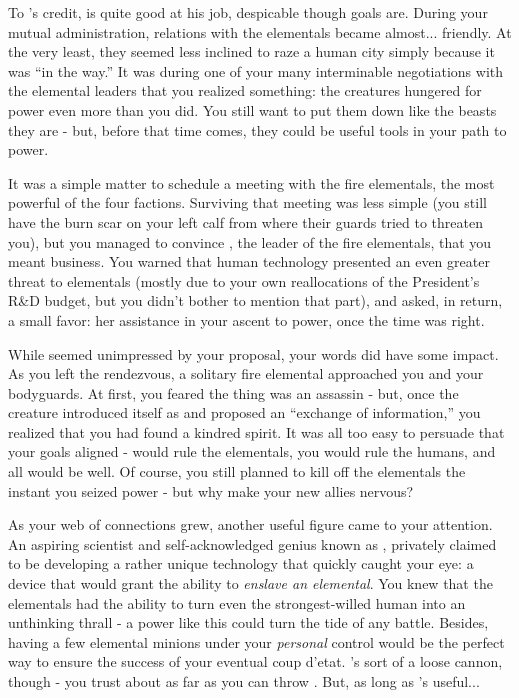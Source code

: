 \documentclass[char]{elementals}
\begin{document}
To \cLeader{}'s credit, \cLeader{\they} is quite good at his job, despicable though \cLeader{\their} goals are. During your mutual administration, relations with the elementals became almost... friendly. At the very least, they seemed less inclined to raze a human city simply because it was ``in the way.'' It was during one of your many interminable negotiations with the elemental leaders that you realized something: the creatures hungered for power even more than you did. You still want to put them down like the beasts they are - but, before that time comes, they could be useful tools in your path to power.

It was a simple matter to schedule a meeting with the fire elementals, the most powerful of the four factions. Surviving that meeting was less simple (you still have the burn scar on your left calf from where their guards tried to threaten you), but you managed to convince \cQueen{\intro}, the leader of the fire elementals, that you meant business. You warned \cQueen{\them} that human technology presented an even greater threat to elementals (mostly due to your own reallocations of the President's R\&D budget, but you didn't bother to mention that part), and asked, in return, a small favor: her assistance in your ascent to power, once the time was right.

While \cQueen{} seemed unimpressed by your proposal, your words did have some impact. As you left the rendezvous, a solitary fire elemental approached you and your bodyguards. At first, you feared the thing was an assassin - but, once the creature introduced itself as \cPyro{\intro} and proposed an ``exchange of information,'' you realized that you had found a kindred spirit. It was all too easy to persuade \cPyro{\them} that your goals aligned - \cPyro{\they} would rule the elementals, you would rule the humans, and all would be well. Of course, you still planned to kill off the elementals the instant you seized power - but why make your new allies nervous?

As your web of connections grew, another useful figure came to your attention. An aspiring scientist and self-acknowledged genius known as \cMS{\intro}, \cMS{\they} privately claimed to be developing a rather unique technology that quickly caught your eye: a device that would grant the ability to \emph{enslave an elemental}. You knew that the elementals had the ability to turn even the strongest-willed human into an unthinking thrall - a power like this could turn the tide of any battle. Besides, having a few elemental minions under your \emph{personal} control would be the perfect way to ensure the success of your eventual coup d'etat. \cMS{\They}'s sort of a loose cannon, though - you trust \cMS{\them} about as far as you can throw \cMS{\them}. But, as long as \cMS{\they}'s useful...
\end{document}
